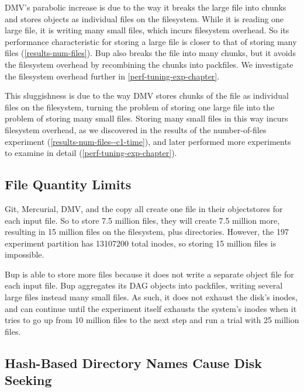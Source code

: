 DMV's parabolic increase is due to the way it breaks the large file into chunks and stores objects as individual files on the filesystem.
While it is reading one large file, it is writing many small files, which incurs filesystem overhead.
So its performance characteristic for storing a large file is closer to that of storing many files (\autoref{results-num-files}).
Bup also breaks the file into many chunks, but it avoids the filesystem overhead by recombining the chunks into \glspl{packfile}.
We investigate the filesystem overhead further in \autoref{perf-tuning-exp-chapter}.

This sluggishness is due to the way DMV stores chunks of the file as individual files on the filesystem, turning the problem of storing one large file into the problem of storing many small files.
Storing many small files in this way incurs filesystem overhead, as we discovered in the results of the number-of-files experiment (\autoref{results-num-files--c1-time}), and later performed more experiments to examine in detail (\autoref{perf-tuning-exp-chapter}).

\subsection{File Quantity Limits}

Git, Mercurial, DMV, and the copy all create one file in their \glspl{objectstore} for each input file.
So to store \num{7.5} million files, they will create \num{7.5} million more, resulting in \num{15} million files on the filesystem, plus directories.
However, the \SI{197}{\gib} experiment partition has \num{13107200} total \glspl{inode}, so storing \num{15} million files is impossible.

Bup is able to store more files because it does not write a separate object file for each input file.
Bup aggregates its DAG objects into \glspl{packfile}, writing several large files instead many small files.
As such, it does not exhaust the disk's \glspl{inode}, and can continue until the experiment itself exhausts the system's \glspl{inode} when it tries to go up from \num{10} million files to the next step and run a trial with \num{25} million files.

\subsection{Hash-Based Directory Names Cause Disk Seeking}


